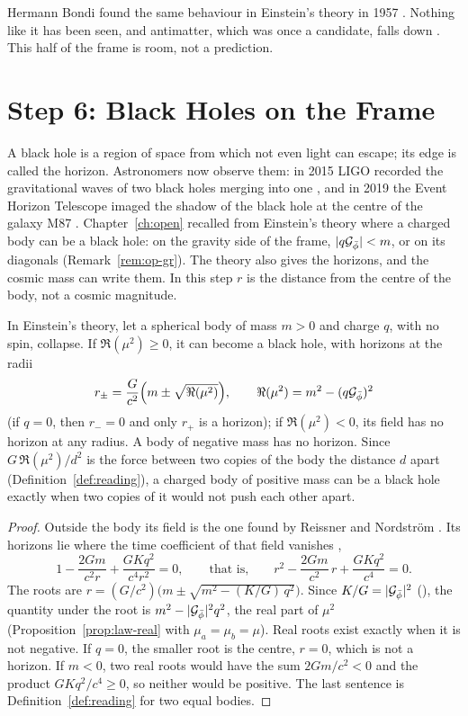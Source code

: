 Hermann Bondi found the same behaviour in Einstein's theory in 1957 \citep{Bondi1957}. Nothing like it has been seen, and antimatter, which was once a candidate, falls down \citep{Anderson2023}. This half of the frame is room, not a prediction.

\section{Step 6: Black Holes on the Frame}\label{sec:fa-black-holes}

A black hole is a region of space from which not even light can escape; its edge is called the horizon. Astronomers now observe them: in 2015 LIGO recorded the gravitational waves of two black holes merging into one \citep{Abbott2016}, and in 2019 the Event Horizon Telescope imaged the shadow of the black hole at the centre of the galaxy M87 \citep{EHT2019}. Chapter~\ref{ch:open} recalled from Einstein's theory where a charged body can be a black hole: on the gravity side of the frame, $|q\mathcal{G}_{\bar{\phi}}| < m$, or on its diagonals (Remark~\ref{rem:op-gr}). The theory also gives the horizons, and the cosmic mass can write them. In this step $r$ is the distance from the centre of the body, not a cosmic magnitude.

\begin{proposition}\label{prop:fa-horizons}
In Einstein's theory, let a spherical body of mass $m > 0$ and charge $q$, with no spin, collapse. If $\Re(\mu^2) \geq 0$, it can become a black hole, with horizons at the radii
\[
r_\pm = \frac{G}{c^2}\Bigl(m \pm \sqrt{\Re(\mu^2)}\Bigr) , \qquad \Re(\mu^2) = m^2 - (q\mathcal{G}_{\bar{\phi}})^2
\]
(if $q = 0$, then $r_- = 0$ and only $r_+$ is a horizon); if $\Re(\mu^2) < 0$, its field has no horizon at any radius. A body of negative mass has no horizon. Since $G\,\Re(\mu^2)/d^2$ is the force between two copies of the body the distance $d$ apart (Definition~\ref{def:reading}), a charged body of positive mass can be a black hole exactly when two copies of it would not push each other apart.
\end{proposition}

\begin{proof}
Outside the body its field is the one found by Reissner and Nordström \citep{Reissner1916,Nordstrom1918}. Its horizons lie where the time coefficient of that field vanishes \citep{MTW1973},
\[
1 - \frac{2Gm}{c^2 r} + \frac{G K q^2}{c^4 r^2} = 0 , \qquad\text{that is,}\qquad r^2 - \frac{2Gm}{c^2}\,r + \frac{G K q^2}{c^4} = 0 .
\]
The roots are $r = (G/c^2)\bigl(m \pm \sqrt{m^2 - (K/G)\,q^2}\bigr)$. Since $K/G = |\mathcal{G}_{\bar{\phi}}|^2$ (), the quantity under the root is $m^2 - |\mathcal{G}_{\bar{\phi}}|^2 q^2$, the real part of $\mu^2$ (Proposition~\ref{prop:law-real} with $\mu_a = \mu_b = \mu$). Real roots exist exactly when it is not negative. If $q = 0$, the smaller root is the centre, $r = 0$, which is not a horizon. If $m < 0$, two real roots would have the sum $2Gm/c^2 < 0$ and the product $GKq^2/c^4 \geq 0$, so neither would be positive. The last sentence is Definition~\ref{def:reading} for two equal bodies.
\end{proof}

